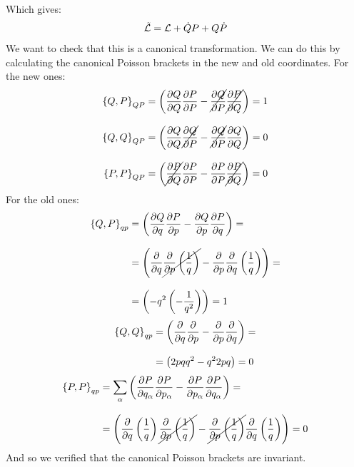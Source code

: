 Which gives:
\begin{equation}
    \tilde{\mathcal{L}} = \mathcal{L} + \dot{Q}P + Q\dot{P}
\end{equation}
We want to check that this is a canonical transformation. We can do this by calculating the canonical Poisson brackets in the new and old coordinates. For the new ones:
\begin{equation}
    \begin{split}
        \pb{Q}{P}_{QP} &= \left(\pdv{Q}{Q} \pdv{P}{P} - \cancel{\pdv{Q}{P}} \cancel{\pdv{P}{Q}} \right) = 1\\[8pt]
        \pb{Q}{Q}_{QP} &= \left(\pdv{Q}{Q} \cancel{\pdv{Q}{P}} - \cancel{\pdv{Q}{P}} \pdv{Q}{Q} \right) = 0\\[8pt]
        \pb{P}{P}_{QP} &= \left(\cancel{\pdv{P}{Q}} \pdv{P}{P}  -  \pdv{P}{P} \cancel{\pdv{P}{Q}}\right) = 0
    \end{split}
\end{equation}
For the old ones:
\begin{equation}
    \begin{split}
        \pb{Q}{P}_{qp} &= \left(\pdv{Q}{q} \pdv{P}{p} - \pdv{Q}{p} \pdv{P}{q} \right) = \\[8pt]
        &= \left(\pdv{}{q}(pq^2) \cancel{\pdv{}{p}\left(\dfrac{1}{q}\right)} - \pdv{}{p}(pq^2) \pdv{}{q}\left(\dfrac{1}{q}\right) \right) = \\[8pt]
        &= \left(- q^2  \left(-\dfrac{1}{q^2}\right) \right) = 1
    \end{split}
\end{equation}
\begin{equation}
    \begin{split}
        \pb{Q}{Q}_{qp} &= \left(\pdv{}{q}(pq^2) \pdv{}{p}(pq^2) - \pdv{}{p}(pq^2) \pdv{}{q}(pq^2) \right) = \\[8pt]
        &= \left(2pq  q^2 - q^2  2pq \right) = 0
    \end{split}
\end{equation}
\begin{equation}
    \begin{split}
        \pb{P}{P}_{qp} &= \bigsum_{\alpha} \left(\pdv{P}{q_{\alpha}} \pdv{P}{p_{\alpha}} - \pdv{P}{p_{\alpha}} \pdv{P}{q_{\alpha}} \right) = \\[8pt]
        &= \left(\pdv{}{q}\left(\dfrac{1}{q}\right) \cancel{\pdv{}{p}\left(\dfrac{1}{q}\right)} - \cancel{\pdv{}{p}\left(\dfrac{1}{q}\right)} \pdv{}{q}\left(\dfrac{1}{q}\right) \right) = 0
    \end{split}
\end{equation}
And so we verified that the canonical Poisson brackets are invariant.

